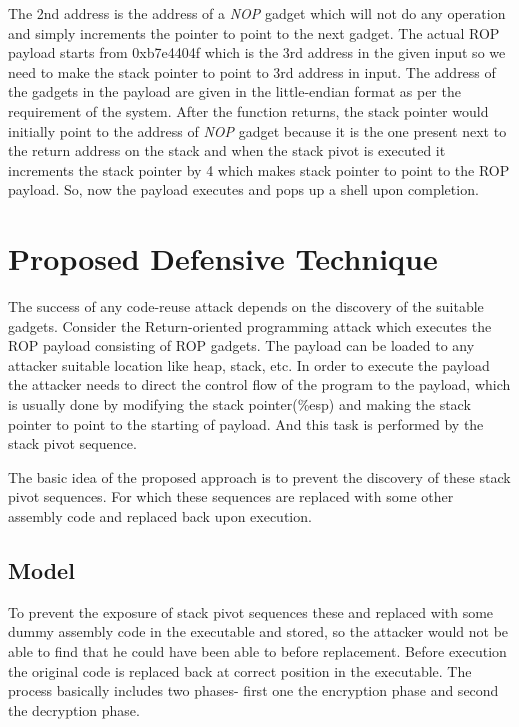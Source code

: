 \documentclass{article}
\begin{document}
\begin{multicols}{2}
	 The 2nd address is the address of a \textit{NOP} gadget which will not do any operation and simply increments the pointer to point to the next gadget. The actual ROP payload starts from 0xb7e4404f which is the 3rd address in the given input so we need to make the stack pointer to point to 3rd address in input. The address of the gadgets in the payload are given in the little-endian format as per the requirement of the system. After the function returns, the stack pointer would initially point to the address of \textit{NOP} gadget because it is the one present next to the return address on the stack and when the stack pivot is executed it increments the stack pointer by 4 which makes stack pointer to point to the ROP payload. So, now the payload executes and pops up a shell upon completion.
	
	\section{Proposed Defensive Technique}
	The success of any code-reuse attack depends on the discovery of the suitable gadgets. Consider the Return-oriented programming attack which executes the ROP payload consisting of ROP gadgets. The payload can be loaded to any attacker suitable location like heap, stack, etc. In order to execute the payload the attacker needs to direct the control flow of the program to the payload, which is usually done by modifying the stack pointer(\%esp) and making the stack pointer to point to the starting of payload. And this task is performed by the stack pivot sequence.
	
	The basic idea of the proposed approach is to prevent the discovery of these stack pivot sequences. For which these sequences are replaced with some other assembly code and replaced back upon execution.
	
	\subsection{Model}
	To prevent the exposure of stack pivot sequences these and replaced with some dummy assembly code in the executable and stored, so the attacker would not be able to find that he could have been able to before replacement. Before execution the original code is replaced back at correct position in the executable. The process basically includes two phases- first one the encryption phase and second the decryption phase.\break
	

\end{multicols}
\end{document}
